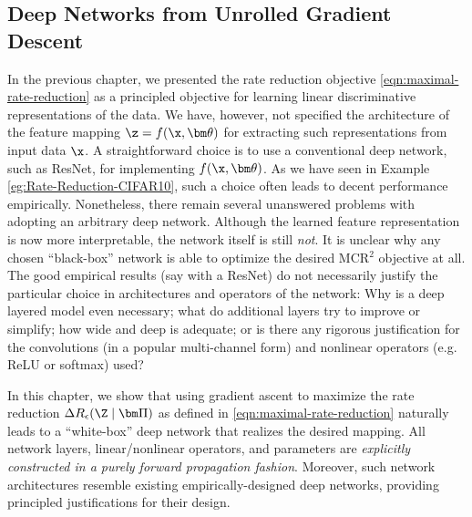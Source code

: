 \documentclass[../../book-main.tex]{subfiles}
\begin{document}
\subsection{Deep Networks from Unrolled Gradient Descent}

In the previous chapter, we presented the rate reduction objective \eqref{eqn:maximal-rate-reduction} as a principled objective for learning linear discriminative representations of the data. We have, however, not specified the architecture of the feature mapping $\z = f(\x, \bm \theta)$ for extracting such representations from input data $\x$. 
A straightforward choice is to use a conventional deep network, such as ResNet, for implementing $f(\x, \bm \theta)$. As we have seen in Example \ref{eg:Rate-Reduction-CIFAR10}, such a choice often leads to decent performance empirically. Nonetheless, there remain several unanswered problems with adopting an arbitrary deep network. Although the learned feature representation is now more interpretable, the network itself is still {\em not}. It is unclear why any chosen ``black-box'' network is able to optimize the desired MCR$^2$ objective at all. The good empirical results (say with a ResNet) do not necessarily justify the particular choice in architectures and operators of the network: Why is a deep layered model even necessary; what do additional layers try to improve or simplify; how wide and deep is adequate; or is there any rigorous justification for the convolutions (in a popular multi-channel form) and nonlinear operators (e.g. ReLU or softmax) used? 

In this chapter, we show that using gradient ascent to maximize the rate reduction $\Delta R_{\epsilon}(\Z \mid \bm \Pi)$ as defined in \eqref{eqn:maximal-rate-reduction} naturally leads to a ``white-box'' deep network that realizes the desired mapping. All network layers, linear/nonlinear operators, and parameters are {\em explicitly constructed in a purely forward propagation fashion}. Moreover, such network architectures resemble existing empirically-designed deep networks, providing principled justifications for their design.
\end{document}
